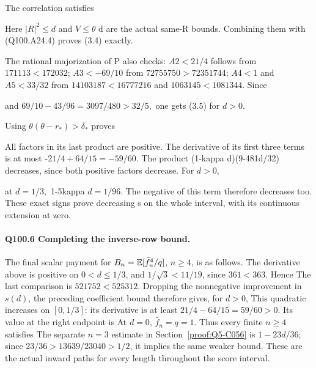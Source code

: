The correlation satisfies


Here \(|R|^2\le d\) and \(V\le \theta\) d are the actual same-R bounds.
Combining them with (Q100.A24.4) proves (3.4) exactly.

The rational majorization of P also checks:
\(A2<21/4\) follows from \(171113<172032\);
\(A3<-69/10\) from \(72755750>72351744\);
\(A4<1\) and \(A5<33/32\) from
\(14103187<16777216\) and \(1063145<1081344.\)
Since


and \(69/10-43/96=3097/480>32/5,\allowbreak \) one gets (3.5) for \(d>0.\)

Using \(\theta(\theta-r_*)>\delta_*\) proves


All factors in its last product are positive. The derivative of its first
three terms is at most -\(21/4+64/15=-59/60.\) The product
(1-kappa d)(9-481d/32) decreases, since both positive factors decrease.
For \(d>0,\allowbreak \)


at \(d=1/3,\allowbreak \) 1-5kappa \(d=1/96.\) The negative of this term therefore
decreases too. These exact signs prove decreasing s on the whole
interval, with its continuous extension at zero. 

\paragraph{Q100.6 Completing the inverse-row bound.}
The final scalar payment for
\(B_n=\mathbb E[\bar f_n^4/q]\), \(n\ge4\), is as follows.
The derivative above is positive on \(0<d\le1/3\), and
\(1/\sqrt3<11/19\), since \(361<363\). Hence
The last comparison is \(521752<525312\).
Dropping the nonnegative improvement in \(s(d)\), the preceding
coefficient bound therefore gives, for \(d>0\),
This quadratic increases on \([0,\allowbreak 1/3]\): its derivative is at least
\(21/4-64/15=59/60>0\). Its value at the right endpoint is
At \(d=0\), \(\bar f_n=q=1\). Thus every finite \(n\ge4\) satisfies
The separate \(n=3\) estimate in Section~\ref{proof:Q5-C056} is
\(1-23d/36\); since \(23/36>13639/23040>1/2\), it implies the
same weaker bound. These are the actual inward paths for every
length throughout the score interval.
